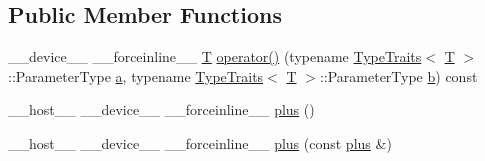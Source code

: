 \subsection*{Public Member Functions}
\begin{DoxyCompactItemize}
\item 
\-\_\-\-\_\-device\-\_\-\-\_\- \-\_\-\-\_\-forceinline\-\_\-\-\_\- \hyperlink{calib3d_8hpp_a3efb9551a871ddd0463079a808916717}{T} \hyperlink{structcv_1_1gpu_1_1device_1_1plus_a1560db4ce3c349ab7fe339e6c8b4ade2}{operator()} (typename \hyperlink{structcv_1_1gpu_1_1device_1_1TypeTraits}{Type\-Traits}$<$ \hyperlink{calib3d_8hpp_a3efb9551a871ddd0463079a808916717}{T} $>$\-::Parameter\-Type \hyperlink{legacy_8hpp_a1031d0e0a97a340abfe0a6ab9e831045}{a}, typename \hyperlink{structcv_1_1gpu_1_1device_1_1TypeTraits}{Type\-Traits}$<$ \hyperlink{calib3d_8hpp_a3efb9551a871ddd0463079a808916717}{T} $>$\-::Parameter\-Type \hyperlink{legacy_8hpp_ac04272e8ca865b8fba18d36edae9fd2a}{b}) const 
\item 
\-\_\-\-\_\-host\-\_\-\-\_\- \-\_\-\-\_\-device\-\_\-\-\_\- \-\_\-\-\_\-forceinline\-\_\-\-\_\- \hyperlink{structcv_1_1gpu_1_1device_1_1plus_affe92259c5c3479ed09f737601e3fcd8}{plus} ()
\item 
\-\_\-\-\_\-host\-\_\-\-\_\- \-\_\-\-\_\-device\-\_\-\-\_\- \-\_\-\-\_\-forceinline\-\_\-\-\_\- \hyperlink{structcv_1_1gpu_1_1device_1_1plus_a317a700002aed42774af698da1124319}{plus} (const \hyperlink{structcv_1_1gpu_1_1device_1_1plus}{plus} \&)
\end{DoxyCompactItemize}


